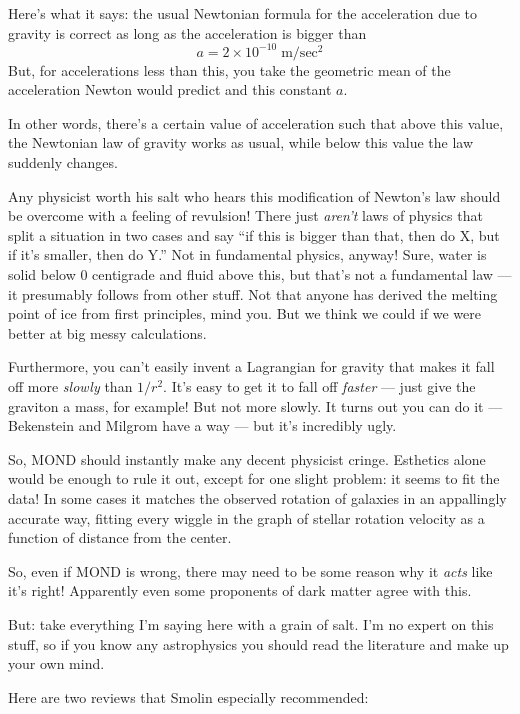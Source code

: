 \documentclass{article}
\renewcommand{\texttt}[1]{%
  \begingroup
  \ttfamily
  \begingroup\lccode`~=`/\lowercase{\endgroup\def~}{/\discretionary{}{}{}}%
  \begingroup\lccode`~=`[\lowercase{\endgroup\def~}{[\discretionary{}{}{}}%
  \begingroup\lccode`~=`.\lowercase{\endgroup\def~}{.\discretionary{}{}{}}%
  \catcode`/=\active\catcode`[=\active\catcode`.=\active
  \scantokens{#1\noexpand}%
  \endgroup
}
\begin{document}
Here's what it says: the usual Newtonian formula for the acceleration
due to gravity is correct as long as the acceleration is bigger than
\[a = 2 \times 10^{-10} \;\mathrm{m}/\mathrm{sec}^2\] But, for
accelerations less than this, you take the geometric mean of the
acceleration Newton would predict and this constant \(a\).

In other words, there's a certain value of acceleration such that above
this value, the Newtonian law of gravity works as usual, while below
this value the law suddenly changes.

Any physicist worth his salt who hears this modification of Newton's law
should be overcome with a feeling of revulsion! There just \emph{aren't}
laws of physics that split a situation in two cases and say ``if this is
bigger than that, then do X, but if it's smaller, then do Y.'' Not in
fundamental physics, anyway! Sure, water is solid below \(0\) centigrade
and fluid above this, but that's not a fundamental law --- it presumably
follows from other stuff. Not that anyone has derived the melting point
of ice from first principles, mind you. But we think we could if we were
better at big messy calculations.

Furthermore, you can't easily invent a Lagrangian for gravity that makes
it fall off more \emph{slowly} than \(1/r^2\). It's easy to get it to
fall off \emph{faster} --- just give the graviton a mass, for example!
But not more slowly. It turns out you can do it --- Bekenstein and
Milgrom have a way --- but it's incredibly ugly.

So, MOND should instantly make any decent physicist cringe. Esthetics
alone would be enough to rule it out, except for one slight problem: it
seems to fit the data! In some cases it matches the observed rotation of
galaxies in an appallingly accurate way, fitting every wiggle in the
graph of stellar rotation velocity as a function of distance from the
center.

So, even if MOND is wrong, there may need to be some reason why it
\emph{acts} like it's right! Apparently even some proponents of dark
matter agree with this.

But: take everything I'm saying here with a grain of salt. I'm no expert
on this stuff, so if you know any astrophysics you should read the
literature and make up your own mind.

Here are two reviews that Smolin especially recommended:

\end{document}
